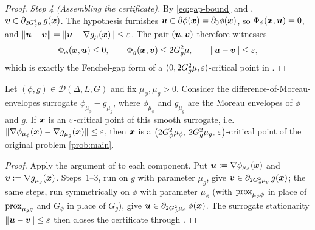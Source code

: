 \begin{proof}
\emph{Step 4 (Assembling the certificate).}
By \eqref{eq:gap-bound} and ,
$\bm{v}\in\partial_{2G_g^2\mu}\,g(\bm{x})$. The hypothesis furnishes
$\bm{u}\in\partial\phi(\bm{x})=\partial_0\phi(\bm{x})$, so $\Phi_\phi(\bm{x},\bm{u})=0$, and
$\|\bm{u}-\bm{v}\|=\|\bm{u}-\nabla g_\mu(\bm{x})\|\le\varepsilon$. The pair $(\bm{u},\bm{v})$ therefore
witnesses
\[
    \Phi_\phi(\bm{x},\bm{u})\le 0,
    \qquad
    \Phi_g(\bm{x},\bm{v})\le 2G_g^2\mu,
    \qquad
    \|\bm{u}-\bm{v}\|\le\varepsilon ,
\]
which is exactly the Fenchel-gap form of a $(0,2G_g^2\mu,\varepsilon)$-critical point
in .
\end{proof}

\begin{corollary}
\label{cor:dme-reduction}
Let $(\phi,g)\in\mathcal D(\Delta,L,G)$ and fix $\mu_\phi,\mu_g>0$. Consider the
difference-of-Moreau-envelopes surrogate $\phi_{\mu_\phi}-g_{\mu_g}$, where
$\phi_{\mu_\phi}$ and $g_{\mu_g}$ are the Moreau envelopes of $\phi$ and $g$.
If $\bm{x}$ is an $\varepsilon$-critical point of this smooth surrogate, i.e.\
$\|\nabla\phi_{\mu_\phi}(\bm{x})-\nabla g_{\mu_g}(\bm{x})\|\le\varepsilon$, then $\bm{x}$ is a
$\bigl(2G_\phi^2\mu_\phi,\,2G_g^2\mu_g,\,\varepsilon\bigr)$-critical point of the
original problem \eqref{prob:main}.
\end{corollary}

\begin{proof}
Apply the argument of  to each component. Put
$\bm{u}:=\nabla\phi_{\mu_\phi}(\bm{x})$ and $\bm{v}:=\nabla g_{\mu_g}(\bm{x})$. Steps~1--3,
run on $g$ with parameter $\mu_g$, give
$\bm{v}\in\partial_{2G_g^2\mu_g}\,g(\bm{x})$; the same steps, run symmetrically on
$\phi$ with parameter $\mu_\phi$ (with $\mathrm{prox}_{\mu_\phi\phi}$ in place of
$\mathrm{prox}_{\mu_g g}$ and $G_\phi$ in place of $G_g$), give
$\bm{u}\in\partial_{2G_\phi^2\mu_\phi}\,\phi(\bm{x})$. The surrogate stationarity
$\|\bm{u}-\bm{v}\|\le\varepsilon$ then closes the certificate through
.
\end{proof}


